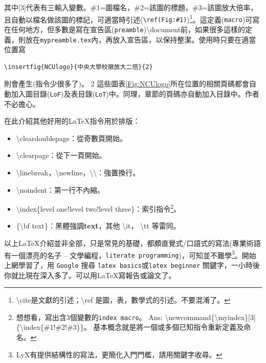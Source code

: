 其中[3]代表有三輸入變數。\#1=圖檔名，\#2=該圖的標題，\#3=該圖放大倍率，且自動以檔名做該圖的標記，可適當時引述({\tt \textbackslash ref(Fig:\#1)})\footnote{\textbackslash cite是文獻的引述；\textbackslash ref 是圖，表，數學式的引述。不要混淆了。}。這定義({\tt macro})可寫在任何地方，但多數是寫在宣告區({\tt preamble})\textbackslash document前，如果很多這樣的定義，則放在{\tt mypreamble.tex}內，再放入宣告區，以保持整潔。使用時只要在適當位置寫
\begin{Verbatim}[frame=single,firstline=1,label={Macro usage}]
\insertfig{NCUlogo}{中央大學校徽放大二倍}{2}
\end{Verbatim}
則會產生(指令少很多了)。
 {2}
這些圖表\ref{Fig:NCUlogo}所在位置的相關頁碼都會自動加入圖目錄({\tt LoF})及表目錄({\tt LoT})中。同理，章節的頁碼亦自動加入目錄中。作者不必擔心。


在此介紹其他好用的\LaTeX{}指令用於排版：
\begin{itemize}
\item \textbackslash cleardoublepage：從奇數頁開始。 
\item \textbackslash clearpage：從下一頁開始。       
\item \textbackslash linebreak，\textbackslash newline，\textbackslash\textbackslash：強置換行。  
\item \textbackslash noindent：第一行不內縮。        
\item \textbackslash index\{level one!level two!level three\}：索引指令\footnote{想想看，寫出含3個變數的{\tt index macro}。 Ans: \textbackslash newcommand\{\textbackslash myindex\}[3]\{\textbackslash index\{\#1!\#2!\#3\}\}。 基本概念就是將一個或多個已知指令重新定義及命名。}。
\item \{\textbackslash bf text\}：黑體強調{\bf text}，其他 \textbackslash it， \textbackslash tt 等雷同。
\end{itemize}
以上\LaTeX{}介紹並非全部，只是常見的基礎，都頗直覺式/口語式的寫法(專業術語有一個漂亮的名子 -- 文學編程，{\tt literate programming})，可知並不難學\footnote{LyX有提供結構性的寫法，更簡化入門門檻，請用關鍵字收尋。}。開始上網學習了，用 {\tt Google} 搜尋 {\tt latex basics}或{\tt latex beginner} 關鍵字，一小時後你就比現在深入多了。可以用\LaTeX{}寫報告或論文了。

